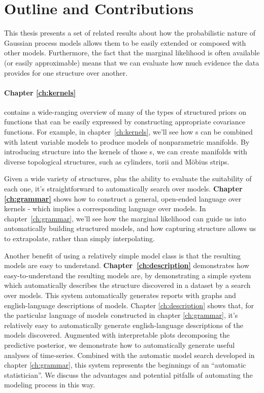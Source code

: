 \section{Outline and Contributions}

This thesis presents a set of related results about how the probabilistic nature of Gaussian process models allows them to be easily extended or composed with other models.
Furthermore, the fact that the marginal likelihood is often available (or easily approximable) means that we can evaluate how much evidence the data provides for one structure over another.

\paragraph{Chapter \ref{ch:kernels}} contains a wide-ranging overview of many of the types of structured priors on functions that can be easily expressed by constructing appropriate covariance functions.
For example, in chapter~\ref{ch:kernels}, we'll see how \gp{}s can be combined with latent variable models to produce models of nonparametric manifolds.
By introducing structure into the kernels of those \gp{}s, we can create manifolds with diverse topological structures, such as cylinders, torii and M\"obius strips.

Given a wide variety of structures, plus the ability to evaluate the suitability of each one, it's straightforward to automatically search over models.
{\bf Chapter \ref{ch:grammar}} shows how to construct a general, open-ended language over kernels - which implies a corresponding language over models.
In chapter~\ref{ch:grammar}, we'll see how the marginal likelihood can guide us into automatically building structured models, and how capturing structure allows us to extrapolate, rather than simply interpolating.

Another benefit of using a relatively simple model class is that the resulting models are easy to understand.
{\bf Chapter~\ref{ch:description}} demonstrates how easy-to-understand the resulting models are, by demonstrating a simple system which automatically describes the structure discovered in a dataset by a search over \gp{} models.
This system automatically generates reports with graphs and english-language descriptions of \gp{} models.
Chapter \ref{ch:description} shows that, for the particular language of models constructed in chapter \ref{ch:grammar}, it's relatively easy to automatically generate english-language descriptions of the models discovered.
Augmented with interpretable plots decomposing the predictive posterior, we demonstrate how to automatically generate useful analyses of time-series.
Combined with the automatic model search developed in chapter \ref{ch:grammar}, this system represents the beginnings of an ``automatic statistician''.
We discuss the advantages and potential pitfalls of automating the modeling process in this way.


